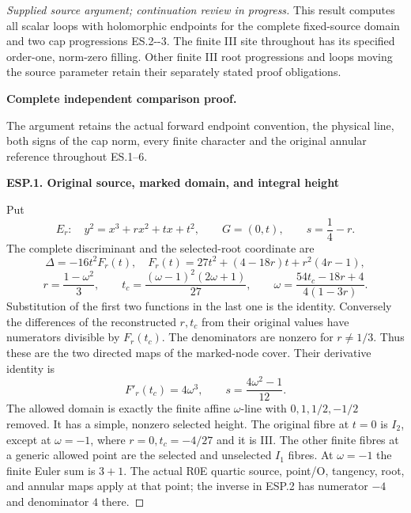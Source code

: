 \begin{proof}[Supplied source argument; continuation review in progress]
This result computes all scalar loops with
holomorphic endpoints for the complete fixed-source
domain and two cap progressions ES.2-\/-3. The
finite III site throughout has its specified
order-one, norm-zero filling. Other finite
III root progressions and loops moving the
source parameter retain their separately
stated proof obligations.


\par\bigskip\noindent\textbf{Complete independent comparison proof.}\par\nobreak

The argument retains the actual forward endpoint convention,
the physical line, both signs of the cap norm, every finite character
and the original annular reference throughout ES.1--6.

\par

\medskip\noindent\textbf{ESP.1. Original source, marked domain, and integral height}

\par\nobreak

Put
\[
 E_r:\quad y^2=x^3+rx^2+tx+t^2,\qquad G=(0,t),
 \qquad s=\frac14-r.
 \tag{ESP.1}
\]
The complete discriminant and the selected-root coordinate are
\[
 \Delta=-16t^2F_r(t),\quad
 F_r(t)=27t^2+(4-18r)t+r^2(4r-1),
\]
\[
 r=\frac{1-\omega^2}{3},\qquad
 t_c=\frac{(\omega-1)^2(2\omega+1)}{27},\qquad
 \omega=\frac{54t_c-18r+4}{4(1-3r)}.
 \tag{ESP.2}
\]
Substitution of the first two functions in the last one is the
identity. Conversely the differences of the reconstructed \(r,t_c\)
from their original values have numerators divisible by \(F_r(t_c)\).
The denominators are nonzero for \(r\ne1/3\). Thus these are the
two directed maps of the marked-node cover. Their derivative identity is
\[
                 F'_r(t_c)=4\omega^3,
 \qquad s=\frac{4\omega^2-1}{12}.
 \tag{ESP.3}
\]
The allowed domain is exactly the finite affine \(\omega\)-line with
\(0,1,1/2,-1/2\) removed. It has a simple, nonzero selected height.
The original fibre at \(t=0\) is \(I_2\), except at \(\omega=-1\),
where \(r=0,t_c=-4/27\) and it is III. The other finite fibres at a
generic allowed point are the selected and unselected \(I_1\) fibres.
At \(\omega=-1\) the finite Euler sum is \(3+1\). The actual R0E
quartic source, point/O, tangency, root, and annular maps apply at that
point; the inverse in ESP.2 has numerator \(-4\) and denominator
\(4\) there.


\end{proof}
